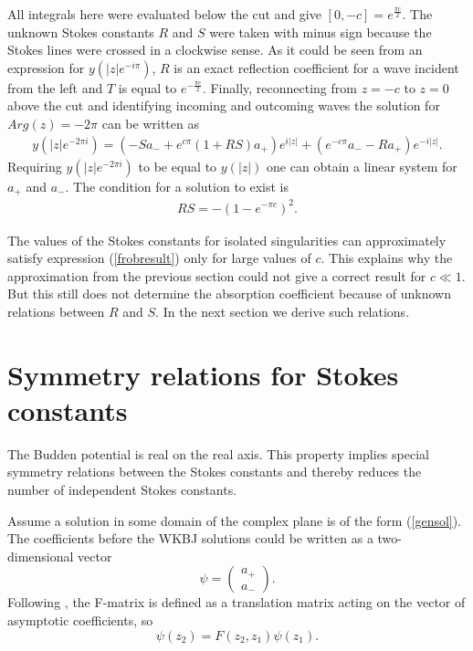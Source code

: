 \documentclass[aps,prl,preprint,superscriptaddress]{revtex4}
\begin{document}
All integrals here were evaluated below the cut and give $[0,-c]=e^{\frac{\pi c}{2}}$. The unknown Stokes constants $R$ and $S$ were taken with minus sign because the Stokes lines were crossed in a clockwise sense. As it could be seen from an expression for \mbox{$y(|z|e^{-i\pi})$}, $R$ is an exact reflection coefficient for a wave incident from the left and $T$ is equal to $e^{-\frac{\pi c}{2}}$.
Finally, reconnecting from $z=-c$ to $z=0$ above the cut and identifying incoming and outcoming waves the solution for \mbox{$Arg(z)=-2\pi$} can be written as
\begin{eqnarray}
y(|z|e^{-2\pi i})=(-Sa_- +e^{c \pi}(1+RS)a_+)e^{i|z|}+(e^{-c \pi} a_- - R a_+)e^{-i|z|}.   \label{m2pirot}
\end{eqnarray}
Requiring $y(|z|e^{-2\pi i})$ to be equal to $y(|z|)$ one can obtain a linear system for $a_+$ and $a_-$. The condition for a solution to exist is
\begin{eqnarray}
RS=-(1-e^{-\pi c})^2.   \label{frobresult}
\end{eqnarray}

The values of the Stokes constants for isolated singularities can approximately satisfy expression (\ref{frobresult}) only for large values of $c$. This explains why the approximation from the previous section could not give a correct result for \mbox{$c\ll 1$}. But this still does not determine  the absorption coefficient because of unknown relations between $R$ and $S$. In the next section we derive such relations.

\section{Symmetry relations for Stokes constants \label{symmetries}}
The Budden potential is real on the real axis. This property implies special symmetry relations between the Stokes constants  and thereby reduces the number of independent Stokes constants.

Assume a solution in some domain of the complex plane is of the form (\ref{gensol}). The coefficients before the WKBJ solutions could be written as a two-dimensional vector
\[
\psi=\left( \begin{array}{c} a_+ \\ a_- \end{array} \right).
\]
Following \cite[pp~21-33]{froman}, the F-matrix is defined as a translation matrix acting on the vector of asymptotic coefficients, so
\[
\psi(z_2)=F(z_2,z_1)\psi(z_1).
\]
\end{document}
